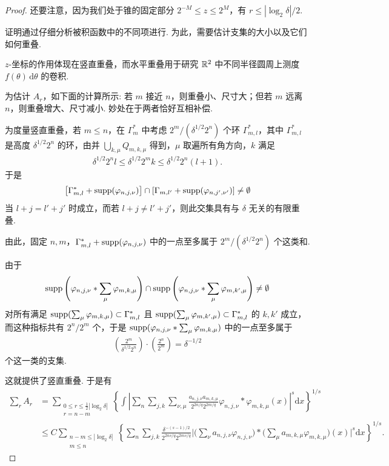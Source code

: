 \begin{proof}
还要注意，因为我们处于锥的固定部分 $2^{-M} \leq z \leq 2^M$，有 $r \leq |\log_2 \delta|/2$.

证明通过仔细分析被积函数中的不同项进行. 为此，需要估计支集的大小以及它们如何重叠.

$z$-坐标的作用体现在竖直重叠，而水平重叠用于研究 $\mathbb{R}^{2}$ 中不同半径圆周上测度 $f(\theta)\,\mathrm{d}\theta$ 的卷积.

为估计 $A_{r}$，如下面的计算所示: 若 $m$ 接近 $n$，则重叠小、尺寸大；但若 $m$ 远离 $n$，则重叠增大、尺寸减小. 妙处在于两者恰好互相补偿.

为度量竖直重叠，若 $m \leq n$，在 $\Gamma_m^*$ 中考虑 $2^m/(\delta^{1/2}2^n)$ 个环 $\Gamma_{m,l}^*$，其中 $\Gamma_{m,l}^*$ 是高度 $\delta^{1/2}2^n$ 的环，由并 $\bigcup_{k,\mu} Q_{m,k,\mu}$ 得到，$\mu$ 取遍所有角方向，$k$ 满足
\begin{align*}
  \delta^{1/2}2^{n}l\leq\delta^{1/2}2^{m}k\leq\delta^{1/2}2^{n}(l+1).
\end{align*}
于是
\begin{align*}
  \left[\Gamma_{m,l}^{*}+\operatorname{supp}(\varphi_{n,j,\nu})\right]
  \cap\left[\Gamma_{m,l'}+\operatorname{supp}(\varphi_{n,j',\nu'})\right]\neq\emptyset
\end{align*}
当 $l + j = l' + j'$ 时成立，而若 $l + j \neq l' + j'$，则此交集具有与 $\delta$ 无关的有限重叠.

由此，固定 $n, m$，$\Gamma_{m,l}^{*}+\operatorname{supp}(\varphi_{n,j,\nu})$ 中的一点至多属于 $2^{m}/(\delta^{1/2}2^{n})$ 个这类和.

由于
\begin{align*}
  \operatorname{supp}\left(\varphi_{n,j,\nu}*\sum_{\mu}\varphi_{m,k,\mu}\right)
  \cap\operatorname{supp}\left(\varphi_{n,j,\nu}*\sum_{\mu}\varphi_{m,k',\mu}\right)\neq\emptyset
\end{align*}
对所有满足 $\operatorname{supp}(\sum_\mu \varphi_{m,k,\mu}) \subset \Gamma_{m,l}^*$ 且 $\operatorname{supp}(\sum_\mu \varphi_{m,k',\mu}) \subset \Gamma_{m,l}^*$ 的 $k, k'$ 成立，而这种指标共有 $2^n/2^m$ 个，于是 $\operatorname{supp}(\varphi_{n,j,\nu} * \sum_\mu \varphi_{m,k,\mu})$ 中的一点至多属于
\begin{align*}
  \left(\frac{2^{m}}{\delta^{1/2}2^{n}}\right)\cdot\left(\frac{2^{n}}{2^{m}}\right)=\delta^{-1/2}
\end{align*}
个这一类的支集.

这就提供了竖直重叠. 于是有
\begin{equation}\label{eq:5.7}
  \begin{aligned}
  \sum_{r}A_{r}
  &=\sum_{\substack{0\leq r\leq\frac{1}{2}|\log_{2}\delta|\\ r=n-m}}
   \left\{\int\left|\sum_{n}\sum_{j,k}\sum_{\nu,\mu}\frac{a_{n,j,\nu}a_{m,k,\mu}}{2^{2n/q}2^{2m/q}}
   \varphi_{n,j,\nu}*\varphi_{m,k,\mu}(x)\right|^{s}\mathrm{d}x\right\}^{1/s}\\
  &\leq C\sum_{\substack{n-m\leq|\log_{2}\delta|\\ m\leq n}}
   \left\{\sum_{n}\sum_{j,k}\frac{\delta^{-(s-1)/2}}{2^{2ns/q}2^{2ms/q}}
   \Big|\Big(\sum_{\nu}a_{n,j,\nu}\varphi_{n,j,\nu}\Big)
   *\Big(\sum_{\mu}a_{m,k,\mu}\varphi_{m,k,\mu}\Big)(x)\Big|^{s}\mathrm{d}x\right\}^{1/s}.
  \end{aligned}
\end{equation}


\end{proof}
